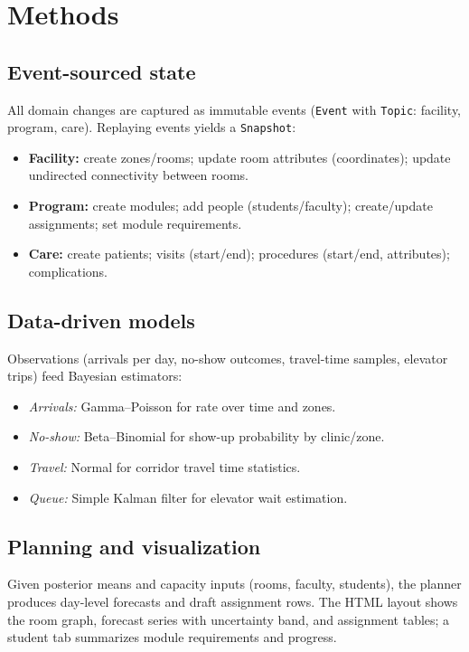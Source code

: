 \documentclass[Afour,sageh,times]{sagej}
\begin{document}
\section{Methods}
\subsection{Event-sourced state}
All domain changes are captured as immutable events (\texttt{Event} with \texttt{Topic}: facility, program, care). Replaying events yields a \texttt{Snapshot}:
\begin{itemize}[leftmargin=*,itemsep=2pt]
  \item \textbf{Facility:} create zones/rooms; update room attributes (coordinates); update undirected connectivity between rooms.
  \item \textbf{Program:} create modules; add people (students/faculty); create/update assignments; set module requirements.
  \item \textbf{Care:} create patients; visits (start/end); procedures (start/end, attributes); complications.
\end{itemize}

\subsection{Data-driven models}
Observations (arrivals per day, no-show outcomes, travel-time samples, elevator trips) feed Bayesian estimators:
\begin{itemize}[leftmargin=*,itemsep=2pt]
  \item \emph{Arrivals:} Gamma–Poisson for rate over time and zones.
  \item \emph{No-show:} Beta–Binomial for show-up probability by clinic/zone.
  \item \emph{Travel:} Normal for corridor travel time statistics.
  \item \emph{Queue:} Simple Kalman filter for elevator wait estimation.
\end{itemize}

\subsection{Planning and visualization}
Given posterior means and capacity inputs (rooms, faculty, students), the planner produces day-level forecasts and draft assignment rows. The HTML layout shows the room graph, forecast series with uncertainty band, and assignment tables; a student tab summarizes module requirements and progress.
\end{document}
